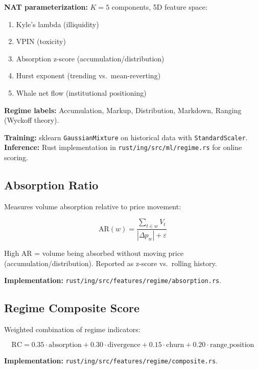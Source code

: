 \documentclass[11pt,a4paper]{article}
\begin{document}
\textbf{NAT parameterization:} $K = 5$ components, 5D feature space:
\begin{enumerate}
    \item Kyle's lambda (illiquidity)
    \item VPIN (toxicity)
    \item Absorption z-score (accumulation/distribution)
    \item Hurst exponent (trending vs.\ mean-reverting)
    \item Whale net flow (institutional positioning)
\end{enumerate}

\textbf{Regime labels:} Accumulation, Markup, Distribution, Markdown, Ranging (Wyckoff theory).

\textbf{Training:} sklearn \texttt{GaussianMixture} on historical data with \texttt{StandardScaler}. \textbf{Inference:} Rust implementation in \texttt{rust/ing/src/ml/regime.rs} for online scoring.

\subsection{Absorption Ratio}

Measures volume absorption relative to price movement:

\begin{equation}
\text{AR}(w) = \frac{\sum_{t \in w} V_t}{|\Delta p_w| + \varepsilon}
\end{equation}

High AR = volume being absorbed without moving price (accumulation/distribution). Reported as z-score vs.\ rolling history.

\textbf{Implementation:} \texttt{rust/ing/src/features/regime/absorption.rs}.

\subsection{Regime Composite Score}

Weighted combination of regime indicators:

\begin{equation}
\text{RC} = 0.35 \cdot \text{absorption} + 0.30 \cdot \text{divergence} + 0.15 \cdot \text{churn} + 0.20 \cdot \text{range\_position}
\end{equation}

\textbf{Implementation:} \texttt{rust/ing/src/features/regime/composite.rs}.

\newpage
\end{document}
